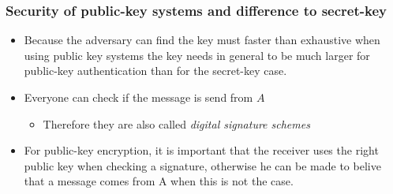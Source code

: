\documentclass[11pt]{article}
\begin{document}
\subsubsection{Security of public-key systems and difference to secret-key}
\label{sec:org1cffc5e}
\begin{itemize}
\item Because the adversary can find the key must faster than exhaustive when using public key systems the key needs in general to be much larger for public-key authentication than for the secret-key case.

\item Everyone can check if the message is send from \(A\)
\begin{itemize}
\item Therefore they are also called \emph{digital signature schemes}
\end{itemize}

\item For public-key encryption, it is important that the receiver uses the right public key when checking a signature, otherwise he can be made to belive that a message comes from A when this is not the case.
\end{itemize}
\end{document}
